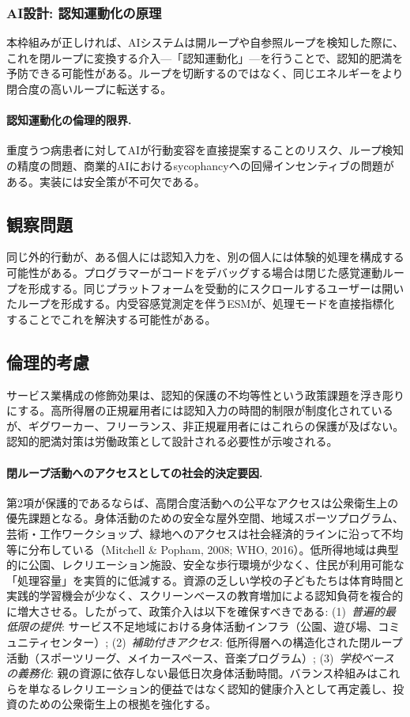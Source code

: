 \documentclass[a4paper,11pt,titlepage]{article}
\begin{document}
\subsubsection{AI設計: 認知運動化の原理}

本枠組みが正しければ、AIシステムは開ループや自参照ループを検知した際に、これを閉ループに変換する介入---「認知運動化」---を行うことで、認知的肥満を予防できる可能性がある。ループを切断するのではなく、同じエネルギーをより閉合度の高いループに転送する。

\paragraph{認知運動化の倫理的限界.}
重度うつ病患者に対してAIが行動変容を直接提案することのリスク、ループ検知の精度の問題、商業的AIにおけるsycophancyへの回帰インセンティブの問題がある。実装には安全策が不可欠である。

\subsection{観察問題}

同じ外的行動が、ある個人には認知入力を、別の個人には体験的処理を構成する可能性がある。プログラマーがコードをデバッグする場合は閉じた感覚運動ループを形成する。同じプラットフォームを受動的にスクロールするユーザーは開いたループを形成する。内受容感覚測定を伴うESMが、処理モードを直接指標化することでこれを解決する可能性がある。

\subsection{倫理的考慮}\label{sec:ai-implications}

サービス業構成の修飾効果は、認知的保護の不均等性という政策課題を浮き彫りにする。高所得層の正規雇用者には認知入力の時間的制限が制度化されているが、ギグワーカー、フリーランス、非正規雇用者にはこれらの保護が及ばない。認知的肥満対策は労働政策として設計される必要性が示唆される。

\paragraph{閉ループ活動へのアクセスとしての社会的決定要因.}
第2項が保護的であるならば、高閉合度活動への公平なアクセスは公衆衛生上の優先課題となる。身体活動のための安全な屋外空間、地域スポーツプログラム、芸術・工作ワークショップ、緑地へのアクセスは社会経済的ラインに沿って不均等に分布している（Mitchell \& Popham, 2008; WHO, 2016）。低所得地域は典型的に公園、レクリエーション施設、安全な歩行環境が少なく、住民が利用可能な「処理容量」を実質的に低減する。資源の乏しい学校の子どもたちは体育時間と実践的学習機会が少なく、スクリーンベースの教育増加による認知負荷を複合的に増大させる。したがって、政策介入は以下を確保すべきである: (1)~\textit{普遍的最低限の提供}: サービス不足地域における身体活動インフラ（公園、遊び場、コミュニティセンター）; (2)~\textit{補助付きアクセス}: 低所得層への構造化された閉ループ活動（スポーツリーグ、メイカースペース、音楽プログラム）; (3)~\textit{学校ベースの義務化}: 親の資源に依存しない最低日次身体活動時間。バランス枠組みはこれらを単なるレクリエーション的便益ではなく認知的健康介入として再定義し、投資のための公衆衛生上の根拠を強化する。
\end{document}
